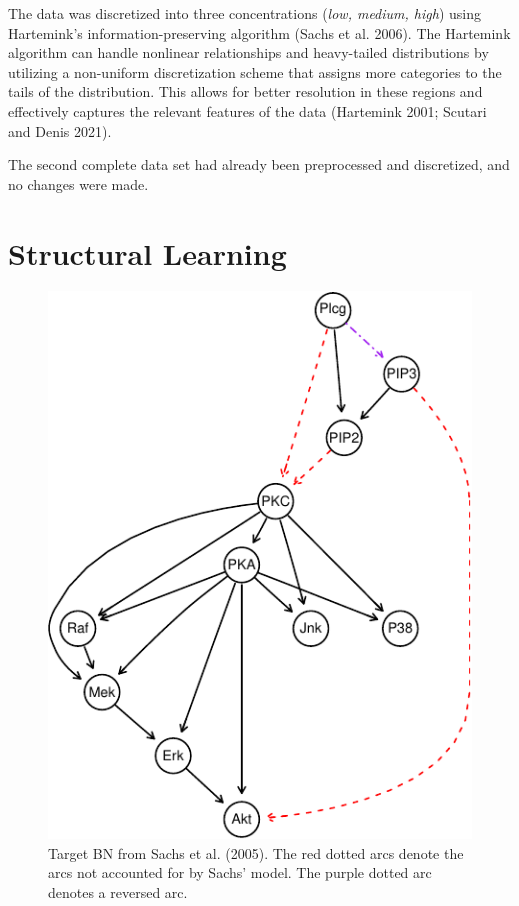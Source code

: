 \documentclass[twocol]{ametsoc}
\begin{document}
The data was discretized into three concentrations (\emph{low, medium,
high}) using Hartemink's information-preserving algorithm (Sachs et al.
2006). The Hartemink algorithm can handle nonlinear relationships and
heavy-tailed distributions by utilizing a non-uniform discretization
scheme that assigns more categories to the tails of the distribution.
This allows for better resolution in these regions and effectively
captures the relevant features of the data (Hartemink 2001; Scutari and
Denis 2021).

The second complete data set had already been preprocessed and
discretized, and no changes were made.

\hypertarget{structural-learning}{%
\section{Structural Learning}\label{structural-learning}}

\begin{figure}

{\centering \includegraphics{paper_files/figure-latex/fig4-1} 

}

\caption{Target BN from Sachs et al. (2005). The red dotted arcs denote the arcs not accounted for by Sachs' model. The purple dotted arc denotes a reversed arc.}\label{fig:fig4}
\end{figure}
\end{document}
